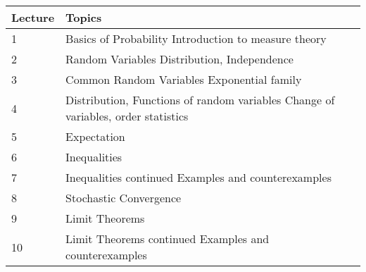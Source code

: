 \documentclass[12pt]{article}
\begin{document}
\begin{longtable}{| p{1.5cm}  | p{8cm} | p{3cm} |}
\hline
{\bf{Lecture}}  & {\bf{Topics}} \\
\hline
1  & Basics of Probability \newline Introduction to measure theory \\
\hline
2 &  Random Variables \newline Distribution, Independence \\
\hline
3  & Common Random Variables \newline Exponential family \\
\hline
4  & Distribution, Functions of random variables  \newline Change of variables, order statistics \\
\hline
5  & Expectation  \\
\hline
6  &  Inequalities \\
\hline
7  & Inequalities continued \newline Examples and counterexamples \\
\hline
8  &  Stochastic Convergence \\
 \hline
9  &  Limit Theorems  \\
\hline
10  &  Limit Theorems continued \newline Examples and counterexamples  \\
\hline
\end{longtable}
\end{document}

